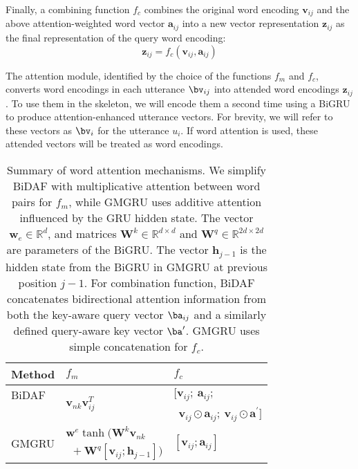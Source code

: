 Finally, a combining function $f_{c}$ combines the original word
encoding $\bm{v}_{ij}$ and the above attention-weighted word vector
$\bm{a}_{ij}$ into a new vector representation $\bm{z}_{ij}$ as the final
representation of the query word encoding:
\begin{equation}
\bm{z}_{ij}= f_{c}(\bm{v}_{ij}, \bm{a}_{ij})
\end{equation}

The attention module, identified by the choice of the functions
$f_m$ and $f_c$, converts word encodings in each utterance
$\bv_{ij}$ into attended word encodings $\bm{z}_{ij}$. To use them
in the \HGRU skeleton, we will encode them a second time using a
BiGRU to produce attention-enhanced utterance vectors. For brevity,
we will refer to these vectors as $\bv_i$ for the utterance
$u_i$. If word attention is used, these attended vectors will be
treated as word encodings.


\begin{table}[t]
\begin{center}
  \setlength{\tabcolsep}{3pt}
  {\small
    \begin{tabular}{ll|l}
      \toprule
      Method                 & $f_{m} $                                    & $f_{c}$                                                             \\ \hline
      BiDAF                  & \multirow{2}{*}{$\bm{v}_{nk} {\bm{v}_{ij}^{T}}$}             & $[\bm{v}_{ij};~\bm{a}_{ij};  $                                      \\
                             &                                             & $~~\bm{v}_{ij} \odot \bm{a}_{ij};~\bm{v}_{ij}\odot \bm{a}^{\prime}]$ \\ \hline
      \multirow{2}{*}{GMGRU} & $\bm{w}^{e} \tanh(\bm{W}^{k}\bm{v}_{nk}$    & \multirow{2}{*}{$[\bm{v}_{ij};\bm{a}_{ij}]$}                        \\
                             & $~~+ \bm{W}^{q}[\bm{v}_{ij}; \bm{h}_{j-1}])$ &                                                                     \\ \hline
    \end{tabular}
  }
\end{center}
\caption{\label{tbl:word_att} Summary of word attention mechanisms.
  We simplify BiDAF with multiplicative attention between  word
  pairs for $f_{m}$, while GMGRU uses additive attention
  influenced by the GRU hidden state.
  The vector $\bm{w}_{e} \in\mathbb{R}^{d}$, and matrices
  $\bm{W}^{k}\in \mathbb{R}^{d \times d}$ and
  $\bm{W}^{q} \in\mathbb{R}^{2d \times 2d}$ are parameters of the BiGRU. The vector $\bm{h}_{j-1}$
  is the hidden state from the BiGRU in GMGRU at previous position
  $j-1$.  
  For combination function, BiDAF concatenates bidirectional
  attention information from both the key-aware query vector
  $\ba_{ij}$ and a similarly defined query-aware key vector
  $\ba^{\prime}$. GMGRU uses simple concatenation for $f_c$.}
\end{table}

